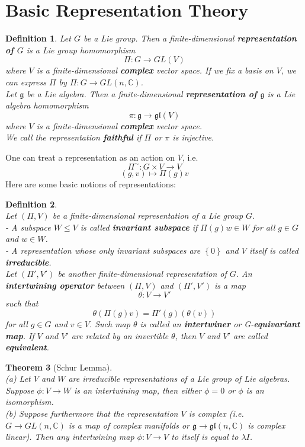 \documentclass[11pt]{article}
\newtheorem{theorem}{Theorem}[section]
\newtheorem{definition}[theorem]{Definition}
\newcommand{\bb}[1]{\mathbb{#1}}
\newcommand{\mf}[1]{\mathfrak{#1}}
\begin{document}
\newpage

\section{Basic Representation Theory}
\begin{definition}
Let $G$ be a Lie group. Then a finite-dimensional \textbf{representation of $G$} is a Lie group homomorphism
$$\Pi: G \to GL(V)$$
where $V$ is a finite-dimensional \textbf{complex} vector space. If we fix a basis on $V$, we can express $\Pi$ by $\Pi: G \to GL(n,\bb{C})$.\\
Let $\mf{g}$ be a Lie algebra. Then a finite-dimensional \textbf{representation of $\mf{g}$} is a Lie algebra homomorphism
$$\pi: \mf{g} \to \mf{gl}(V)$$
where $V$ is a finite-dimensional \textbf{complex} vector space.\\
We call the representation \textbf{faithful} if $\Pi$ or $\pi$ is injective.
\end{definition}
One can treat a representation as an action on $V$, i.e.
$$\Pi^{\sim}: G \times V \to V$$
$$(g,v) \mapsto \Pi(g)v$$
Here are some basic notions of representations:
\begin{definition} \mbox{}\\
Let $(\Pi,V)$ be a finite-dimensional representation of a Lie group $G$.\\
- A subspace $W \leq V$ is called \textbf{invariant subspace} if $\Pi(g)w \in W$ for all $g \in G$ and $w \in W$.\\
- A representation whose only invariant subspaces are $\left\{0\right\}$ and $V$ itself is called \textbf{irreducible}.\\
Let $(\Pi', V')$ be another finite-dimensional representation of $G$. An \textbf{intertwining operator} between $(\Pi,V)$ and $(\Pi',V')$ is a map
$$\theta: V \to V'$$
such that
$$\theta(\Pi(g)v) = \Pi'(g)(\theta(v))$$
for all $g \in G$ and $v \in V$. Such map $\theta$ is called an \textbf{intertwiner} or G-\textbf{equivariant map}.
If $V$ and $V'$ are related by an invertible $\theta$, then $V$ and $V'$ are called \textbf{equivalent}.
\end{definition}
\begin{theorem}[Schur Lemma]\mbox{}\\
(a) Let $V$ and $W$ are irreducible representations of a Lie group of Lie algebras. Suppose $\phi: V \to W$ is an intertwining map, then either $\phi = 0$ or $\phi$ is an isomorphism.\\
(b) Suppose furthermore that the representation $V$ is complex (i.e. $G \to GL(n,\bb{C})$ is a map of complex manifolds or $\mf{g} \to \mf{gl}(n,\bb{C})$ is complex linear). Then any intertwining map $\phi: V \to V$ to itself is equal to $\lambda I$.
\end{theorem}
\end{document}
